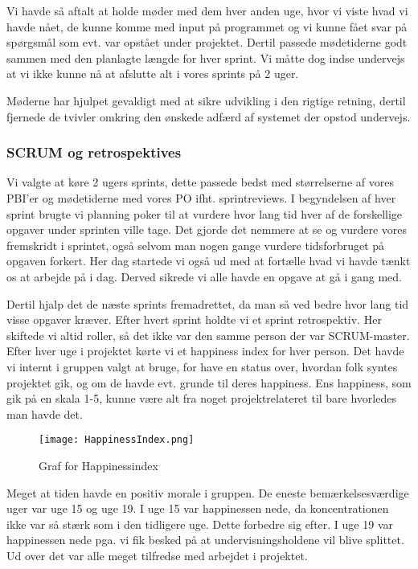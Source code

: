 Vi havde så aftalt at holde møder med dem hver anden uge, hvor vi viste hvad vi havde nået, de kunne komme med input på programmet og vi kunne fået svar på spørgsmål som evt. var opstået under projektet. Dertil passede mødetiderne godt sammen med den planlagte længde for hver sprint. 
Vi måtte dog indse undervejs at vi ikke kunne nå at afslutte alt i vores sprints på 2 uger.

Møderne har hjulpet gevaldigt med at sikre udvikling i den rigtige retning, dertil fjernede de tvivler omkring den ønskede adfærd af systemet der opstod undervejs. 

\subsubsection{SCRUM og retrospektives}

Vi valgte at køre 2 ugers sprints, dette passede bedst med størrelserne af vores PBI'er og mødetiderne med vores PO ifht. sprintreviews.
I begyndelsen af hver sprint brugte vi planning poker til at vurdere hvor lang tid hver af de forskellige opgaver under sprinten ville tage.
Det gjorde det nemmere at se og vurdere vores fremskridt i sprintet, også selvom man nogen gange vurdere tidsforbruget på opgaven forkert.
Her dag startede vi også ud med at fortælle hvad vi havde tænkt os at arbejde på i dag. Derved sikrede vi alle havde en opgave at gå i gang med.

Dertil hjalp det de næste sprints fremadrettet, da man så ved bedre hvor lang tid visse opgaver kræver.
Efter hvert sprint holdte vi et sprint retrospektiv. Her skiftede vi altid roller, så det ikke var den samme person der var SCRUM-master.
Efter hver uge i projektet kørte vi et happiness index for hver person.
Det havde vi internt i gruppen valgt at bruge, for have en status over, hvordan folk syntes projektet gik, og om de havde evt. grunde til deres happiness.
Ens happiness, som gik på en skala 1-5, kunne være alt fra noget projektrelateret til bare hvorledes man havde det.

\begin{figure}[h]
    \caption{Graf for Happinessindex}
    \centering
        \texttt{[image: HappinessIndex.png]}
    \label{happinessindex}
\end{figure}

Meget at tiden havde en positiv morale i gruppen. De eneste bemærkelsesværdige uger var uge 15 og uge 19.
I uge 15 var happinessen nede, da koncentrationen ikke var så stærk som i den tidligere uge. Dette forbedre sig efter.
I uge 19 var happinessen nede pga. vi fik besked på at undervisningsholdene vil blive splittet. Ud over det var alle meget tilfredse med arbejdet i projektet.


